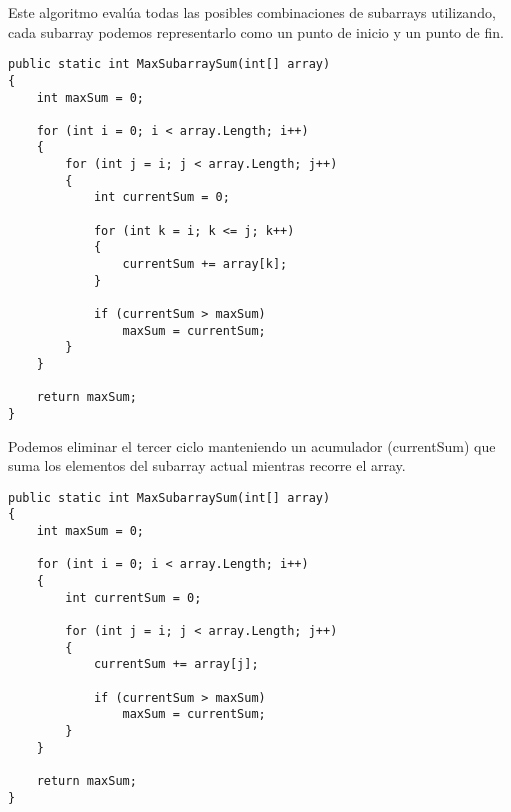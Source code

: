 Este algoritmo evalúa todas las posibles combinaciones de subarrays utilizando, cada subarray podemos representarlo como un punto de inicio y un punto de fin.
\begin{lstlisting}
public static int MaxSubarraySum(int[] array)
{
    int maxSum = 0;

    for (int i = 0; i < array.Length; i++)
    {
        for (int j = i; j < array.Length; j++)
        {
            int currentSum = 0;

            for (int k = i; k <= j; k++)
            {
                currentSum += array[k];
            }

            if (currentSum > maxSum)
                maxSum = currentSum;
        }
    }

    return maxSum;
}
\end{lstlisting}

Podemos eliminar el tercer ciclo manteniendo un acumulador (currentSum) que suma los elementos del subarray actual mientras recorre el array.

\begin{lstlisting}
public static int MaxSubarraySum(int[] array)
{
    int maxSum = 0;

    for (int i = 0; i < array.Length; i++)
    {
        int currentSum = 0;

        for (int j = i; j < array.Length; j++)
        {
            currentSum += array[j];

            if (currentSum > maxSum)
                maxSum = currentSum;
        }
    }

    return maxSum;
}
\end{lstlisting}